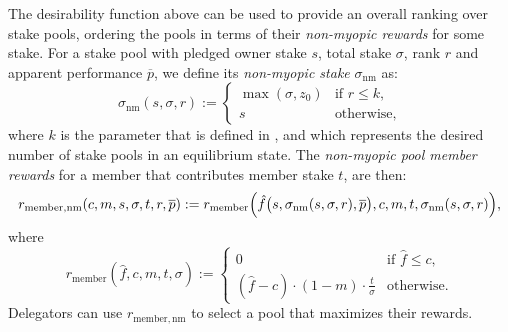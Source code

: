 \documentclass[11pt,a4paper,dvipsnames,twosided]{article}
\newcommand\pbar{\overline{p}}
\begin{document}
The desirability function above can be used to provide an overall ranking over stake pools,
ordering the pools in terms of their \emph{non-myopic rewards} for some stake.
For a stake pool with pledged owner stake $s$, total stake $\sigma$, rank
$r$ and apparent performance $\pbar$, we define its \emph{non-myopic stake} $\sigma_\mathrm{nm}$ as:
\[
    \sigma_\mathrm{nm}(s,\sigma,r) :=
    \left\{
    \begin{array}{ll}
        \max(\sigma,z_0) &
        \text{if $r\leq k$,} \\
        s &
        \text{otherwise,}
    \end{array}
    \right.
\]
where $k$ is the parameter that is defined in \cite[Section 5.2]{delegation_design},
and which represents the desired number of stake pools in an equilibrium state.
%
The \emph{non-myopic pool member rewards}
for a member that contributes member stake $t$, are then:
\[
    r_\mathrm{member, nm}(c, m, s, \sigma, t, r, \pbar) :=
    r_\mathrm{member}\Bigl(\hat{f}\bigl(s,\sigma_\mathrm{nm}(s,\sigma, r),
    \pbar\bigr),
    c, m, t, \sigma_\mathrm{nm}(s,\sigma,r)\Bigr),
\label{eq:non-myopic-member-rewards}
\]
where
\[
    r_\mathrm{member}(\hat{f}, c, m, t, \sigma) :=
    \left\{
    \begin{array}{ll}
        \displaystyle 0 &
        \text{if $\hat{f}\leq c$,} \\
        \displaystyle (\hat{f} - c)\cdot(1-m)\cdot\frac{t}{\sigma} &
        \text{otherwise.}
    \end{array}
    \right.
\]
Delegators can use $r_\mathrm{member, nm}$ to select a pool
that maximizes their rewards.



\end{document}
